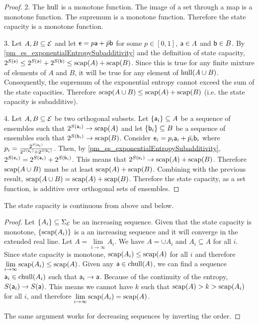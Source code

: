 \begin{mathSection}
\begin{proof}
	2. The $\hull$ is a monotone function. The image of a set through a map is a monotone function. The supremum is a monotone function. Therefore the state capacity is a monotone function.
	
	3. Let $A, B \subseteq \Ens$ and let $\ens = p \ens[a] + \bar{p} \ens[b]$ for some $p \in [0,1]$, $\ens[a] \in A$ and $\ens[b] \in B$. By \ref{pm_es_exponentialEntropySubadditivity} and the definition of state capacity, $2^{S(\ens)} \leq 2^{S(\ens[a])} + 2^{S(\ens[b])} \leq \capacity(A) + \capacity(B)$. Since this is true for any finite mixture of elements of $A$ and $B$, it will be true for any element of $\hull(A \cup B)$. Consequently, the supremum of the exponential entropy cannot exceed the sum of the state capacities. Therefore $\capacity(A \cup B) \leq \capacity(A) + \capacity(B)$ (i.e. the state capacity is subadditive).
	
	4. Let $A, B \subseteq \Ens$ be two orthogonal subsets. Let $\{\ens[a]_i\} \subseteq A$ be a sequence of ensembles such that $2^{S(\ens[a]_i)} \to \capacity(A)$ and let $\{\ens[b]_i\} \subseteq B$ be a sequence of ensembles such that $2^{S(\ens[b]_i)} \to \capacity(B)$. Consider $\ens_i = p_i \ens[a]_i + \bar{p_i} \ens[b]_i$ where $p_i = \frac{2^{S(\ens[a]_i)}}{2^{S(\ens[a]_i)} + 2^{S(\ens[b]_i)}}$. Then, by \ref{pm_es_exponentialEntropySubadditivity}, $2^{S(\ens_i)} = 2^{S(\ens[a]_i)} + 2^{S(\ens[b]_i)}$. This means that $2^{S(\ens_i)} \to \capacity(A) + \capacity(B)$. Therefore $\capacity(A \cup B)$ must be at least $\capacity(A) + \capacity(B)$. Combining with the previous result, $\capacity(A \cup B) = \capacity(A) + \capacity(B)$. Therefore the state capacity, as a set function, is additive over orthogonal sets of ensembles.
\end{proof}

\begin{prop}
	The state capacity is continuous from above and below.
\end{prop}

\begin{proof}
	Let $\{A_i\} \subseteq \Sigma_{\Ens}$ be an increasing sequence. Given that the state capacity is monotone, $\{\capacity(A_i)\}$ is a an increasing sequence and it will converge in the extended real line. Let $A = \lim\limits_{i \to \infty} A_i$. We have $A = \cup A_i$ and $A_i \subseteq A$ for all $i$. Since state capacity is monotone, $\capacity(A_i) \leq \capacity(A)$ for all $i$ and therefore $\lim\limits_{i \to \infty} \capacity(A_i) \leq \capacity(A)$. Given any $\ens[a] \in \chull(A)$, we can find a sequence $\ens[a]_i \in \chull(A_i)$ such that $\ens[a]_i \to \ens[a]$. Because of the continuity of the entropy, $S(\ens[a]_i) \to S(\ens[a])$. This means we cannot have $k$ such that $\capacity(A) > k > \capacity(A_i)$ for all $i$, and therefore $\lim\limits_{i \to \infty} \capacity(A_i) = \capacity(A)$.
	
	The same argument works for decreasing sequences by inverting the order.
\end{proof}

\end{mathSection}

